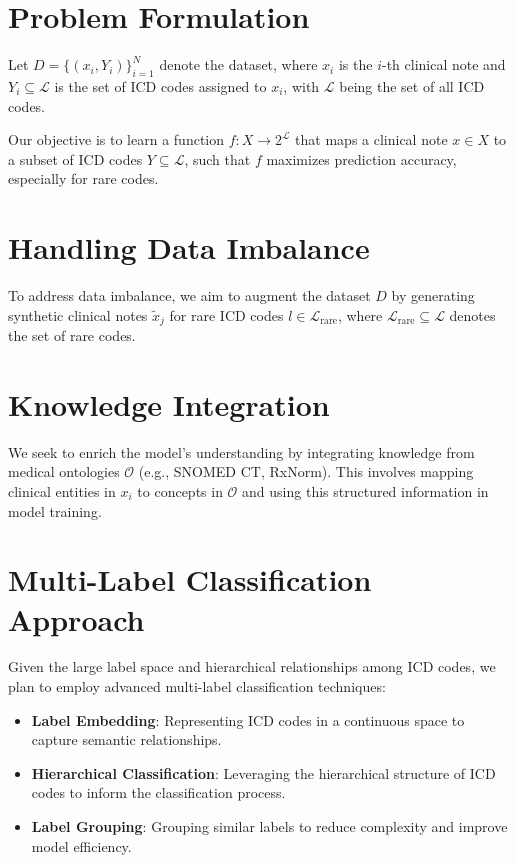 \documentclass[12pt,a4paper]{report}
\begin{document}
\section{Problem Formulation}
Let \( D = \{(x_i, Y_i)\}_{i=1}^N \) denote the dataset, where \( x_i \) is the \( i \)-th clinical note and \( Y_i \subseteq \mathcal{L} \) is the set of ICD codes assigned to \( x_i \), with \( \mathcal{L} \) being the set of all ICD codes.

Our objective is to learn a function \( f: X \rightarrow 2^{\mathcal{L}} \) that maps a clinical note \( x \in X \) to a subset of ICD codes \( Y \subseteq \mathcal{L} \), such that \( f \) maximizes prediction accuracy, especially for rare codes.

\section{Handling Data Imbalance}
To address data imbalance, we aim to augment the dataset \( D \) by generating synthetic clinical notes \( \tilde{x}_j \) for rare ICD codes \( l \in \mathcal{L}_{\text{rare}} \), where \( \mathcal{L}_{\text{rare}} \subseteq \mathcal{L} \) denotes the set of rare codes.

\section{Knowledge Integration}
We seek to enrich the model's understanding by integrating knowledge from medical ontologies \( \mathcal{O} \) (e.g., SNOMED CT, RxNorm). This involves mapping clinical entities in \( x_i \) to concepts in \( \mathcal{O} \) and using this structured information in model training.

\section{Multi-Label Classification Approach}
Given the large label space and hierarchical relationships among ICD codes, we plan to employ advanced multi-label classification techniques:
\begin{itemize}
    \item \textbf{Label Embedding}: Representing ICD codes in a continuous space to capture semantic relationships.
    \item \textbf{Hierarchical Classification}: Leveraging the hierarchical structure of ICD codes to inform the classification process.
    \item \textbf{Label Grouping}: Grouping similar labels to reduce complexity and improve model efficiency.
\end{itemize}
\end{document}
